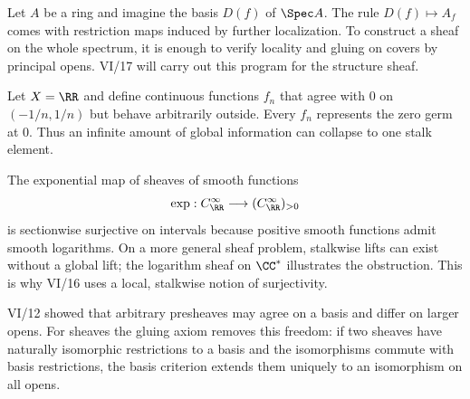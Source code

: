 \begin{example}
Let $A$ be a ring and imagine the basis $D(f)$ of $\Spec A$.  The rule $D(f)\mapsto A_f$
comes with restriction maps induced by further localization.  To construct a sheaf on the
whole spectrum, it is enough to verify locality and gluing on covers by principal opens.
VI/17 will carry out this program for the structure sheaf.
\end{example}

\begin{example}
Let $X=\RR$ and define continuous functions $f_n$ that agree with $0$ on $(-1/n,1/n)$ but
behave arbitrarily outside.  Every $f_n$ represents the zero germ at $0$.  Thus an infinite
amount of global information can collapse to one stalk element.
\end{example}

\begin{example}
The exponential map of sheaves of smooth functions
\[
\exp:C^\infty_\RR\longrightarrow(C^\infty_\RR)_{>0}
\]
is sectionwise surjective on intervals because positive smooth functions admit smooth
logarithms.  On a more general sheaf problem, stalkwise lifts can exist without a global
lift; the logarithm sheaf on $\CC^*$ illustrates the obstruction.  This is why VI/16 uses a
local, stalkwise notion of surjectivity.
\end{example}

\begin{example}
VI/12 showed that arbitrary presheaves may agree on a basis and differ on larger opens.
For sheaves the gluing axiom removes this freedom: if two sheaves have naturally isomorphic
restrictions to a basis and the isomorphisms commute with basis restrictions, the basis
criterion extends them uniquely to an isomorphism on all opens.
\end{example}
